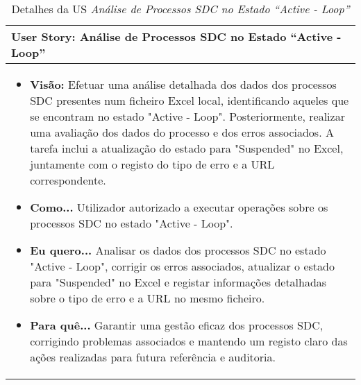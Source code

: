                 \begin{table}[htbp] %
                    \centering
                    \caption{Detalhes da US \textit{Análise de Processos SDC no Estado ``Active - Loop''}}\label{table:python_us1}
                    \begin{tabularx}{1\textwidth}{|>{\raggedright\arraybackslash}X|}
                        \hline
                        \rowcolor{lightgray}
                        \textbf{User Story:} Análise de Processos SDC no Estado ``Active - Loop'' \\
                        \hline
                        \rowcolor{lightgray!20}
                                        
                        \begin{itemize}
                            \item \textbf{Visão:} Efetuar uma análise detalhada dos dados dos processos SDC presentes num ficheiro Excel local, identificando aqueles que se encontram no estado "Active - Loop". Posteriormente, realizar uma avaliação dos dados do processo e dos erros associados. A tarefa inclui a atualização do estado para "Suspended" no Excel, juntamente com o registo do tipo de erro e a URL correspondente.

                            \item \textbf{Como...} Utilizador autorizado a executar operações sobre os processos SDC no estado "Active - Loop".

                            \item \textbf{Eu quero...} Analisar os dados dos processos SDC no estado "Active - Loop", corrigir os erros associados, atualizar o estado para "Suspended" no Excel e registar informações detalhadas sobre o tipo de erro e a URL no mesmo ficheiro.

                            \item \textbf{Para quê...} Garantir uma gestão eficaz dos processos SDC, corrigindo problemas associados e mantendo um registo claro das ações realizadas para futura referência e auditoria.
                        \end{itemize}
                        \\
                        \hline
                    \end{tabularx}
                \end{table}

